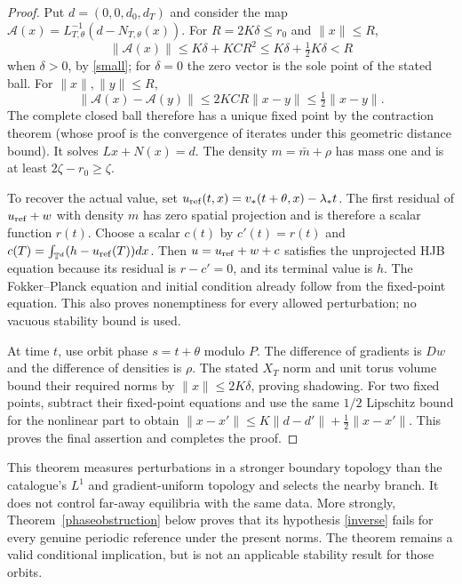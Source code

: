 \documentclass[11pt]{article}
\newcommand{\T}{\mathbb T}
\begin{document}
\begin{proof}
Put $d=(0,0,d_0,d_T)$ and consider the map
$\mathcal A(x)=L_{T,\theta}^{-1}(d-N_{T,\theta}(x))$.
For $R=2K\delta\leq r_0$ and $\|x\|\leq R$,
\[
 \|\mathcal A(x)\|\leq K\delta+KCR^2
 \leq K\delta+\tfrac12K\delta<R
\]
when $\delta>0$, by \eqref{small}; for $\delta=0$ the zero vector
is the sole point of the stated ball. For $\|x\|,\|y\|\leq R$,
\[
 \|\mathcal A(x)-\mathcal A(y)\|
 \leq2KCR\|x-y\|\leq\tfrac12\|x-y\|.
\]
The complete closed ball therefore has a unique fixed point by the
contraction theorem (whose proof is the convergence of iterates under
this geometric distance bound). It solves $Lx+N(x)=d$.
The density $m=\bar m+\rho$ has mass one and is at least
$2\zeta-r_0\geq\zeta$.

To recover the actual value, set
$u_{\rm ref}(t,x)=v_*(t+\theta,x)-\lambda_*t$.
The first residual of $u_{\rm ref}+w$ with density $m$ has zero
spatial projection and is therefore a scalar function $r(t)$.
Choose a scalar $c(t)$ by
$c'(t)=r(t)$ and
$c(T)=\int_{\T^d}(h-u_{\rm ref}(T))dx$.
Then $u=u_{\rm ref}+w+c$ satisfies the unprojected HJB equation
because its residual is $r-c'=0$, and its terminal value is $h$.
The Fokker--Planck equation and initial condition already follow from
the fixed-point equation. This also proves nonemptiness for every
allowed perturbation; no vacuous stability bound is used.

At time $t$, use orbit phase $s=t+\theta$ modulo $P$.
The difference of gradients is $Dw$ and the difference of densities is
$\rho$. The stated $X_T$ norm and unit torus volume bound their required
norms by $\|x\|\leq2K\delta$, proving shadowing.
For two fixed points, subtract their fixed-point equations and use the
same $1/2$ Lipschitz bound for the nonlinear part to obtain
$\|x-x'\|\leq K\|d-d'\|+\tfrac12\|x-x'\|$.
This proves the final assertion and completes the proof.
\end{proof}

This theorem measures perturbations in a stronger boundary topology than
the catalogue's $L^1$ and gradient-uniform topology and selects the nearby
branch. It does not control far-away equilibria with the same data. More
strongly, Theorem~\ref{phaseobstruction} below proves that its hypothesis
\eqref{inverse} fails for every genuine periodic reference under the
present norms. The theorem remains a valid conditional implication, but
is not an applicable stability result for those orbits.
\end{document}
